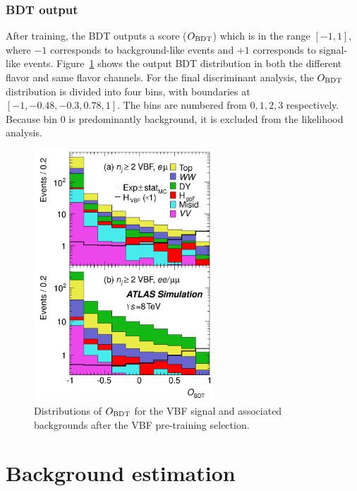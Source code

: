 
\subsubsection{BDT output}

After training, the BDT outputs a score ($O_{\rm BDT}$) which is in the range $[-1, 1]$, where $-1$ corresponds to background-like events and $+1$ corresponds to signal-like events. Figure~\ref{fig:bdtscore} shows the output BDT distribution in both the different flavor and same flavor channels. For the final discriminant analysis, the $O_{\rm BDT}$ distribution is divided into four bins, with boundaries at $[-1, -0.48, -0.3, 0.78, 1]$. The bins are numbered from $0,1,2,3$ respectively. Because bin $0$ is predominantly background, it is excluded from the likelihood analysis. 

\begin{figure}[h!]
  \centering
  \captionsetup{justification=centering}
  \includegraphics[width=0.6\textwidth]{figures/BDT_score}
  \caption{Distributions of $O_{\rm BDT}$ for the VBF signal and associated backgrounds after the VBF pre-training selection\cite{WW2015}.}
  \label{fig:bdtscore}
\end{figure}



\section{Background estimation}
\label{sec:HWWbkg}

